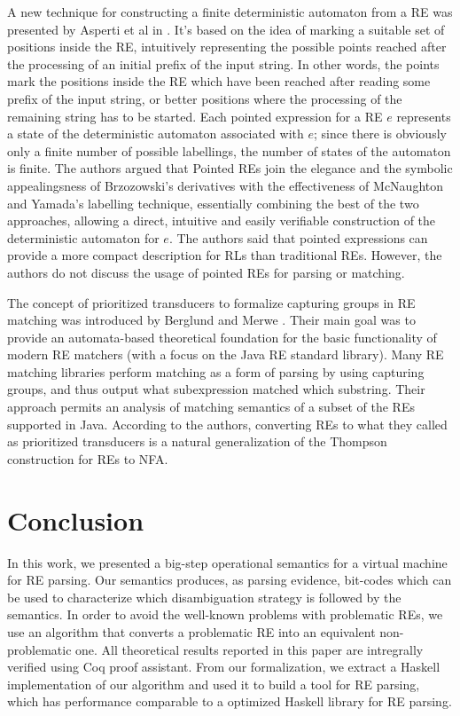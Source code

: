 \documentclass[review]{elsarticle}
\theoremstyle{definition}
\begin{document}
A new technique for constructing a finite deterministic automaton from a 
RE was presented by Asperti et al in \cite{Asperti10}. It's based on the 
idea of marking a suitable set of positions inside the RE, intuitively 
representing the possible points reached after the processing of an initial 
prefix of the input string. In other words, the points mark the positions 
inside the RE which have been reached after reading some prefix of the 
input string, or better positions where the processing of the remaining 
string has to be started. Each pointed expression for a RE $e$ represents 
a state of the deterministic automaton associated with $e$; since there 
is obviously only a finite number of possible labellings, the number 
of states of the automaton is finite. The authors argued that 
Pointed REs join the elegance and the symbolic appealingsness of 
Brzozowski's derivatives with the effectiveness of McNaughton and 
Yamada's labelling technique, essentially combining the best of the 
two approaches, allowing a direct, intuitive and easily verifiable 
construction of the deterministic automaton for $e$. The authors said 
that pointed expressions can provide a more compact description for 
RLs than traditional REs. However, the authors do not discuss the 
usage of pointed REs for parsing or matching.

The concept of prioritized transducers to formalize capturing groups in RE
matching was introduced by Berglund and Merwe \cite{Berglund2016}. Their main
goal was to provide an automata-based theoretical foundation for the basic
functionality of modern RE matchers (with a focus on the Java RE standard
library). Many RE matching libraries perform matching as a form of parsing by 
using capturing groups, and thus output what subexpression matched which
substring. Their approach permits an analysis of matching semantics of a 
subset of the REs supported in Java. According to the authors, converting REs 
to what they called as prioritized transducers is a natural generalization of 
the Thompson construction for REs to NFA.

\section{Conclusion}\label{section:conclusion}

In this work, we presented a big-step operational semantics for a virtual machine for RE parsing. 
Our semantics produces, as parsing evidence, bit-codes which can be used to characterize which
disambiguation strategy is followed by the semantics. In order to avoid the well-known problems with 
problematic REs, we use an algorithm that converts a problematic RE into an equivalent non-problematic one.
All theoretical results reported in this paper are intregrally verified using Coq proof assistant.
From our formalization, we extract a Haskell implementation of our algorithm and used it to build 
a tool for RE parsing, which has performance comparable to a optimized Haskell library
for RE parsing. 
\end{document}
